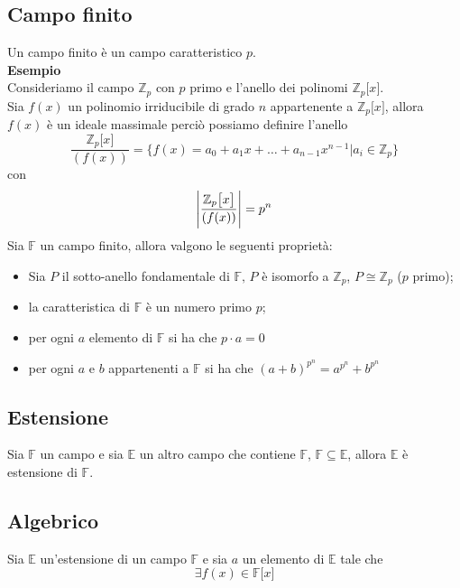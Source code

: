 \begin{flushleft}
\subsection{Campo finito}
Un campo finito è un campo caratteristico $p$.\\
\vspace{10px}
\textbf{Esempio}\\
\vspace{10px}
Consideriamo il campo $\mathbb{Z}_p$ con $p$ primo e l'anello dei polinomi $\mathbb{Z}_p\big[x\big]$.\\
Sia $f(x)$ un polinomio irriducibile di grado $n$ appartenente a $\mathbb{Z}_p\big[x\big]$, allora $f(x)$ è un ideale massimale perciò possiamo definire l'anello
\[\frac{\mathbb{Z}_p\big[x\big]}{(f(x))} = \{f(x) = a_0 + a_1 x +\hdots+a_{n-1} x^{n-1}|a_i \in \mathbb{Z}_p\}\]
con
\[\abs{\frac{\mathbb{Z}_p\big[x\big]}{(f(x))}} = p^n\]
Sia $\mathbb{F}$ un campo finito, allora valgono le seguenti proprietà:
\begin{itemize}
    \item Sia $P$ il sotto-anello fondamentale di $\mathbb{F},\, P$ è isomorfo a $\mathbb{Z}_p$, $P\cong \mathbb{Z}_p$ ($p$ primo);
    \item la caratteristica di $\mathbb{F}$ è un numero primo $p$;
    \item  per ogni $a$ elemento di $\mathbb{F}$ si ha che $p\cdot a = 0$
    \item per ogni $a$ e $b$ appartenenti a $\mathbb{F}$ si ha che $(a+b)^{p^n} = a^{p^n} + b^{p^n}$
\end{itemize}

\subsection{Estensione}
Sia $\mathbb{F}$ un campo e sia $\mathbb{E}$ un altro campo che contiene $\mathbb{F}$, $\mathbb{F}\subseteq\mathbb{E}$, allora $\mathbb{E}$ è estensione di $\mathbb{F}$.

\subsection{Algebrico}
Sia $\mathbb{E}$ un'estensione di un campo $\mathbb{F}$ e sia $a$ un elemento di $\mathbb{E}$ tale che
\[\exists f(x) \in \mathbb{F}\big[x\big]\]


\end{flushleft}
